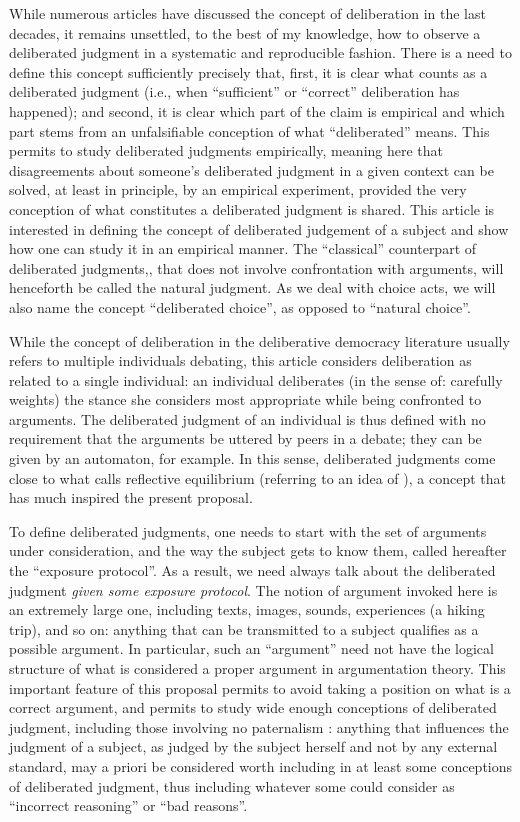 \documentclass[version=last, pagesize, twoside=off, bibliography=totoc, DIV=calc, fontsize=12pt, a4paper, french, english]{scrartcl}
\begin{document}
While numerous articles have discussed the concept of deliberation in the last decades, it remains unsettled, to the best of my knowledge, how to observe a deliberated judgment in a systematic and reproducible fashion. There is a need to define this concept sufficiently precisely that, first, it is clear what counts as a deliberated judgment (i.e., when “sufficient” \citep{meinard_justification_2020} or “correct” deliberation has happened); and second, it is clear which part of the claim is empirical and which part stems from an unfalsifiable conception of what “deliberated” means. This permits to study deliberated judgments empirically, meaning here that disagreements about someone’s deliberated judgment in a given context can be solved, at least in principle, by an empirical experiment, provided the very conception of what constitutes a deliberated judgment is shared. This article is interested in defining the concept of deliberated judgement of a subject and show how one can study it in an empirical manner. The “classical” counterpart of deliberated judgments,, that does not involve confrontation with arguments, will henceforth be called the natural judgment. As we deal with choice acts, we will also name the concept “deliberated choice”, as opposed to “natural choice”.

While the concept of deliberation in the deliberative democracy literature usually refers to multiple individuals debating, this article considers deliberation as related to a single individual: an individual deliberates (in the sense of: carefully weights) the stance she considers most appropriate while being confronted to arguments. The deliberated judgment of an individual is thus defined with no requirement that the arguments be uttered by peers in a debate; they can be given by an automaton, for example. In this sense, deliberated judgments come close to what \citet{rawls_theory_1999} calls reflective equilibrium (referring to an idea of \citet{goodman_fact_1983}), a concept that has much inspired the present proposal.

To define deliberated judgments, one needs to start with the set of arguments under consideration, and the way the subject gets to know them, called hereafter the “exposure protocol”. As a result, we need always talk about the deliberated judgment \emph{given some exposure protocol}. The notion of argument invoked here is an extremely large one, including texts, images, sounds, experiences (a hiking trip), and so on: anything that can be transmitted to a subject qualifies as a possible argument. In particular, such an “argument” need not have the logical structure of what is considered a proper argument in argumentation theory. This important feature of this proposal permits to avoid taking a position on what is a correct argument, and permits to study wide enough conceptions of deliberated judgment, including those involving no paternalism \citep{cailloux_formal_2020}: anything that influences the judgment of a subject, as judged by the subject herself and not by any external standard, may a priori be considered worth including in at least some conceptions of deliberated judgment, thus including whatever some could consider as “incorrect reasoning” or “bad reasons”.
\end{document}
